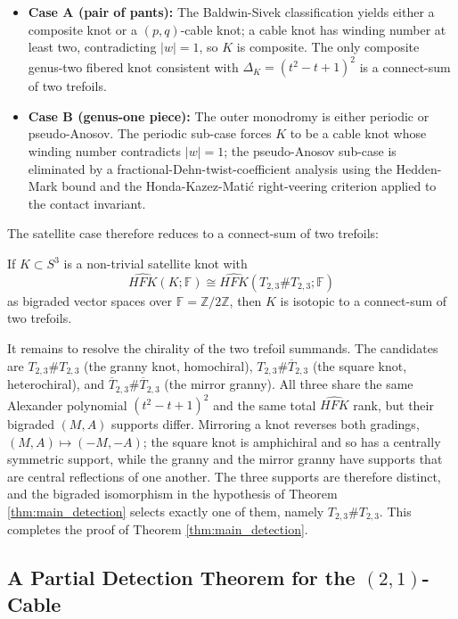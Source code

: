 \begin{itemize}
    \item \textbf{Case A (pair of pants):} The Baldwin-Sivek classification yields either a composite knot or a $(p,q)$-cable knot; a cable knot has winding number at least two, contradicting $|w| = 1$, so $K$ is composite. The only composite genus-two fibered knot consistent with $\Delta_K = (t^2-t+1)^2$ is a connect-sum of two trefoils.
    \item \textbf{Case B (genus-one piece):} The outer monodromy is either periodic or pseudo-Anosov. The periodic sub-case forces $K$ to be a cable knot whose winding number contradicts $|w| = 1$; the pseudo-Anosov sub-case is eliminated by a fractional-Dehn-twist-coefficient analysis using the Hedden-Mark bound and the Honda-Kazez-Mati\'{c} right-veering criterion applied to the contact invariant.
\end{itemize}

The satellite case therefore reduces to a connect-sum of two trefoils:

\begin{corollary}\label{cor:satellite_elimination}
If $K \subset S^3$ is a non-trivial satellite knot with 
\[
\widehat{HFK}(K; \mathbb{F}) \cong \widehat{HFK}(T_{2,3} \# T_{2,3}; \mathbb{F})
\]
as bigraded vector spaces over $\mathbb{F} = \mathbb{Z}/2\mathbb{Z}$, then $K$ is isotopic to a connect-sum of two trefoils.
\end{corollary}

It remains to resolve the chirality of the two trefoil summands. The candidates are $T_{2,3} \# T_{2,3}$ (the granny knot, homochiral), $T_{2,3} \# \overline{T}_{2,3}$ (the square knot, heterochiral), and $\overline{T}_{2,3} \# \overline{T}_{2,3}$ (the mirror granny). All three share the same Alexander polynomial $(t^2 - t + 1)^2$ and the same total $\widehat{HFK}$ rank, but their bigraded $(M, A)$ supports differ. Mirroring a knot reverses both gradings, $(M, A) \mapsto (-M, -A)$; the square knot is amphichiral and so has a centrally symmetric support, while the granny and the mirror granny have supports that are central reflections of one another. The three supports are therefore distinct, and the bigraded isomorphism in the hypothesis of Theorem \ref{thm:main_detection} selects exactly one of them, namely $T_{2,3} \# T_{2,3}$. This completes the proof of Theorem \ref{thm:main_detection}.


\subsection{A Partial Detection Theorem for the $(2,1)$-Cable}

